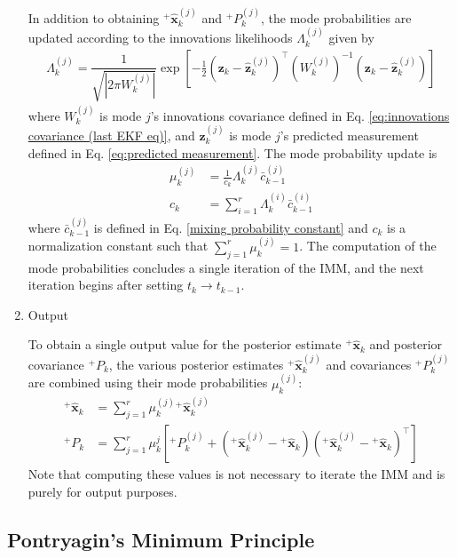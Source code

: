 \documentclass[letterpaper, preprint, paper,11pt]{AAS}	%
\begin{document}
\begin{enumerate}
    In addition to obtaining ${}^+\hat{\bm{x}}_k^{(j)}$ and ${}^+P_k^{(j)}$, the mode probabilities are updated according to the innovations likelihoods $\Lambda_k^{(j)}$ given by
    \begin{align}
        \Lambda_k^{(j)} = \dfrac{1}{\sqrt{|2\pi W_k^{(j)}|}} \exp[-\frac{1}{2} (\bm{z}_k - \bm{\hat{z}}_k^{(j)})^\top (W_k^{(j)})^{-1} (\bm{z}_k - \bm{\hat{z}}_k^{(j)})] \label{eq:innovations-likelihoods}
    \end{align}
    where $W_k^{(j)}$ is mode $j$'s innovations covariance defined in Eq. \ref{eq:innovations covariance (last EKF eq)}, and $\hat{\bm{z}}_k^{(j)}$ is mode $j$'s predicted measurement defined in Eq. \ref{eq:predicted measurement}. The mode probability update is 
    \begin{align}
    \mu_k^{(j)} & = \frac{1}{c_k} \Lambda_k^{(j)} \bar{c}_{k-1}^{(j)} \label{eq:mode-probability-update} \\
    c_k &= \sum_{i=1}^r \Lambda_k^{(i)} \bar{c}_{k-1}^{(i)} 
    \end{align}
    where $\bar{c}_{k-1}^{(j)}$ is defined in Eq. \ref{mixing probability constant} and $c_k$ is a normalization constant such that $\sum_{j=1}^r \mu_k^{(j)} = 1$. The computation of the mode probabilities concludes a single iteration of the IMM, and the next iteration begins after setting $t_k \rightarrow t_{k-1}$.

    \item Output

    To obtain a single output value for the posterior estimate ${}^+\hat{\bm{x}}_k$ and posterior covariance ${}^+P_k $, the various posterior estimates ${}^+\hat{\bm{x}}_k^{(j)}$ and covariances ${}^+P_k^{(j)}$ are combined using their mode probabilities $\mu_k^{(j)}$:
    \begin{align}
        {}^+\bm{\hat{x}}_k &= \sum_{j=1}^r \mu_k^{(j)} {}^+\bm{\hat{x}}_k^{(j)}  \\
        {}^+P_k &= \sum_{j=1}^r \mu_k^j [{}^+P_k^{(j)} + ({}^+\bm{\hat{x}}_k^{(j)} - {}^+\bm{\hat{x}}_k)({}^+\bm{\hat{x}}_k^{(j)} - {}^+\bm{\hat{x}}_k)^\top]
    \end{align}
    Note that computing these values is not necessary to iterate the IMM and is purely for output purposes.
    
\end{enumerate}


\subsection{Pontryagin's Minimum Principle}
\end{document}
